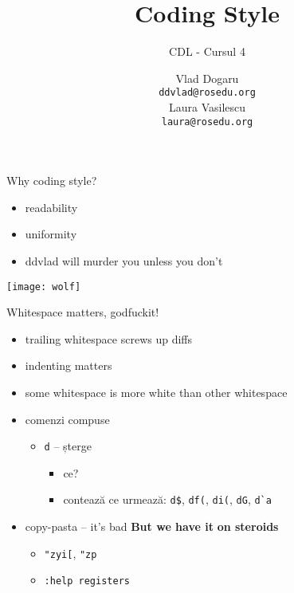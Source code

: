 \documentclass{beamer}
\title[]{Coding Style}
\subtitle{CDL - Cursul 4}
\institute[CDL 2011]{ROSEdu}
\author[]{Vlad Dogaru \\ \texttt{ddvlad@rosedu.org} \\ Laura Vasilescu \\
\texttt{laura@rosedu.org}}
\begin{document}
\maketitle

\begin{frame}{Why coding style?}
  \begin{itemize}
    \item readability
    \pause
    \item uniformity
    \pause
    \item ddvlad will murder you unless you don't
    \pause
  \end{itemize}
\begin{center}
  \texttt{[image: wolf]}
\end{center}
\end{frame}

\begin{frame}{Whitespace matters, godfuckit!}
  \begin{itemize}
    \item trailing whitespace screws up diffs
    \pause
    \item indenting matters
    \pause
    \item some whitespace is more white than other whitespace
    \pause
    \item comenzi compuse
    \pause
    \begin{itemize}
      \item \texttt{d} -- șterge
      \begin{itemize}
        \item ce?
        \pause
        \item contează ce urmează: \texttt{d\$}, \texttt{df(}, \texttt{di(},
          \texttt{dG}, \texttt{d\`{}a}
      \end{itemize}
    \end{itemize}
    \pause
    \item copy-pasta -- it's bad \pause \hspace{1cm} \textbf{But we have it}
    \pause \textbf{on steroids}
    \begin{itemize}
      \pause
      \item \texttt{"zyi[}, \texttt{"zp}
      \item \texttt{:help registers}
    \end{itemize}
  \end{itemize}
\end{frame}
\end{document}
